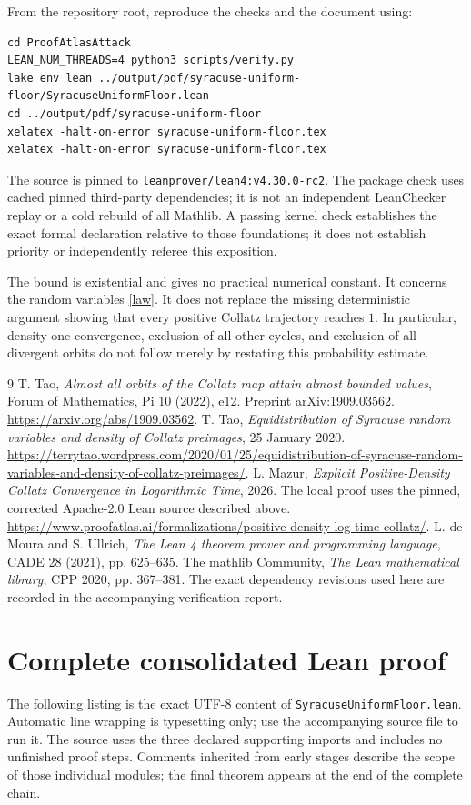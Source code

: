 \documentclass[11pt,a4paper]{article}
\theoremstyle{definition}\newtheorem{definition}[theorem]{Definition}
\theoremstyle{remark}\newtheorem{remark}[theorem]{Remark}
\newcommand{\code}[1]{{\small\nolinkurl{#1}}}
\begin{document}
From the repository root, reproduce the checks and the document using:
\begin{Verbatim}[fontsize=\small,breaklines=true]
cd ProofAtlasAttack
LEAN_NUM_THREADS=4 python3 scripts/verify.py
lake env lean ../output/pdf/syracuse-uniform-floor/SyracuseUniformFloor.lean
cd ../output/pdf/syracuse-uniform-floor
xelatex -halt-on-error syracuse-uniform-floor.tex
xelatex -halt-on-error syracuse-uniform-floor.tex
\end{Verbatim}
The source is pinned to \code{leanprover/lean4:v4.30.0-rc2}. The package
check uses cached pinned third-party dependencies; it is not an independent
LeanChecker replay or a cold rebuild of all Mathlib. A passing kernel check
establishes the exact formal declaration relative to those foundations;
it does not establish priority or independently referee this exposition.

The bound is existential and gives no practical numerical constant.
It concerns the random variables \eqref{law}. It does not replace the
missing deterministic argument showing that every positive Collatz
trajectory reaches $1$. In particular, density-one convergence, exclusion
of all other cycles, and exclusion of all divergent orbits do not follow
merely by restating this probability estimate.

\begin{thebibliography}{9}
 T. Tao, \emph{Almost all orbits of the Collatz map attain
almost bounded values}, Forum of Mathematics, Pi 10 (2022), e12.
Preprint arXiv:1909.03562. \url{https://arxiv.org/abs/1909.03562}.
 T. Tao, \emph{Equidistribution of Syracuse random variables
and density of Collatz preimages}, 25 January 2020.
\url{https://terrytao.wordpress.com/2020/01/25/equidistribution-of-syracuse-random-variables-and-density-of-collatz-preimages/}.
 L. Mazur, \emph{Explicit Positive-Density Collatz Convergence
in Logarithmic Time}, 2026. The local proof uses the pinned, corrected
Apache-2.0 Lean source described above.
\url{https://www.proofatlas.ai/formalizations/positive-density-log-time-collatz/}.
 L. de Moura and S. Ullrich, \emph{The Lean 4 theorem prover
and programming language}, CADE 28 (2021), pp. 625--635.
 The mathlib Community, \emph{The Lean mathematical library},
CPP 2020, pp. 367--381. The exact dependency revisions used here are recorded
in the accompanying verification report.
\end{thebibliography}

\clearpage\appendix
\section{Complete consolidated Lean proof}\label{appendix}
The following listing is the exact UTF-8 content of
\code{SyracuseUniformFloor.lean}. Automatic line wrapping is typesetting
only; use the accompanying source file to run it. The source uses the
three declared supporting imports and includes no unfinished proof steps.
Comments inherited from early stages describe the scope of those individual
modules; the final theorem appears at the end of the complete chain.
\end{document}
